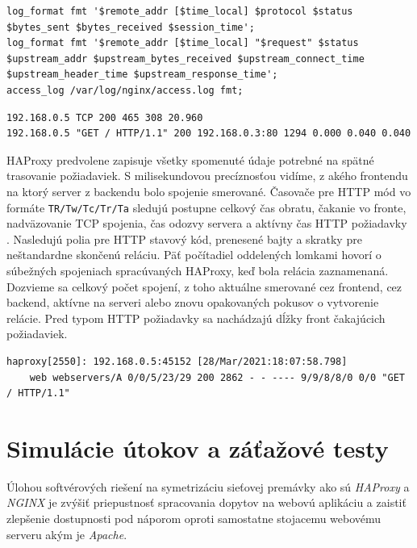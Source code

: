 \documentclass[12pt, a4paper]{article}
\begin{document}
\begin{lstlisting}[caption=NGINX: vlastná štruktúra TCP a HTTP Log, basicstyle=\ttfamily\scriptsize]
log_format fmt '$remote_addr [$time_local] $protocol $status $bytes_sent $bytes_received $session_time';
log_format fmt '$remote_addr [$time_local] "$request" $status $upstream_addr $upstream_bytes_received $upstream_connect_time $upstream_header_time $upstream_response_time';
access_log /var/log/nginx/access.log fmt;
\end{lstlisting}
\begin{lstlisting}[caption=NGINX záznamy z TCP a HTTP logov s vynechanou časovou pečiatkou]
192.168.0.5 TCP 200 465 308 20.960 
192.168.0.5 "GET / HTTP/1.1" 200 192.168.0.3:80 1294 0.000 0.040 0.040
\end{lstlisting}

HAProxy predvolene zapisuje všetky spomenuté údaje potrebné na spätné trasovanie požiadaviek. S milisekundovou
precíznosťou vidíme, z akého frontendu na ktorý server z backendu bolo spojenie smerované. Časovače
pre HTTP mód vo formáte \verb|TR/Tw/Tc/Tr/Ta| sledujú postupne celkový čas obratu, čakanie vo fronte, 
nadväzovanie TCP spojenia, čas odozvy servera a aktívny čas HTTP požiadavky \cite{haproxy-logging}.
Nasledujú polia pre HTTP stavový kód, prenesené bajty a skratky pre neštandardne skončenú reláciu.
Päť počítadiel oddelených lomkami hovorí o súbežných spojeniach spracúvaných HAProxy, keď bola relácia
zaznamenaná. Dozvieme sa celkový počet spojení, z toho aktuálne smerované cez frontend, cez backend,
aktívne na serveri alebo znovu opakovaných pokusov o vytvorenie relácie. Pred typom HTTP požiadavky
sa nachádzajú dĺžky front čakajúcich požiadaviek.
\begin{lstlisting}[caption=HAProxy: predvolený formát záznamov v logoch, basicstyle=\ttfamily\scriptsize]
haproxy[2550]: 192.168.0.5:45152 [28/Mar/2021:18:07:58.798] 
    web webservers/A 0/0/5/23/29 200 2862 - - ---- 9/9/8/8/0 0/0 "GET / HTTP/1.1"
\end{lstlisting}

\section{Simulácie útokov a záťažové testy}
Úlohou softvérových riešení na symetrizáciu sieťovej premávky ako sú \emph{HAProxy} a \emph{NGINX}
je zvýšiť priepustnosť spracovania dopytov na webovú aplikáciu a zaistiť zlepšenie dostupnosti pod
náporom oproti samostatne stojacemu webovému serveru akým je \emph{Apache}. 
\end{document}
